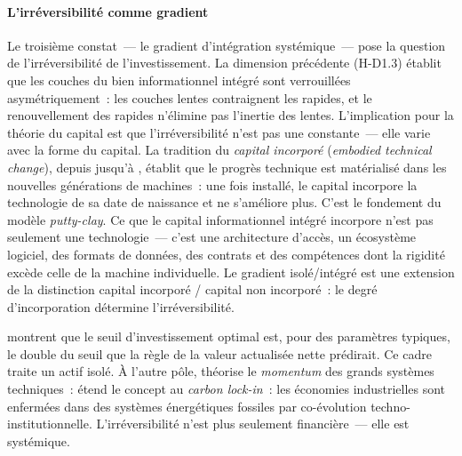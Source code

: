 \paragraph{L'irréversibilité comme gradient}

\markNEO \markSTS
Le troisième constat~--- le gradient d'intégration systémique~--- pose la question de l'irréversibilité de l'investissement. La dimension précédente (H-D1.3) établit que les couches du bien informationnel intégré sont verrouillées asymétriquement~: les couches lentes contraignent les rapides, et le renouvellement des rapides n'élimine pas l'inertie des lentes. L'implication pour la théorie du capital est que l'irréversibilité n'est pas une constante~--- elle varie avec la forme du capital. La tradition du \emph{capital incorporé} (\emph{embodied technical change}), depuis \textcite{solow_investment_1960} jusqu'à \textcite{johansen_substitution_1959}, établit que le progrès technique est matérialisé dans les nouvelles générations de machines~: une fois installé, le capital incorpore la technologie de sa date de naissance et ne s'améliore plus. C'est le fondement du modèle \emph{putty-clay}. Ce que le capital informationnel intégré incorpore n'est pas seulement une technologie~--- c'est une architecture d'accès, un écosystème logiciel, des formats de données, des contrats et des compétences dont la rigidité excède celle de la machine individuelle. Le gradient isolé/intégré est une extension de la distinction capital incorporé / capital non incorporé~: le degré d'incorporation détermine l'irréversibilité.

 \textcite{dixit_pindyck_1994} montrent que le seuil d'investissement optimal est, pour des paramètres typiques, le double du seuil que la règle de la valeur actualisée nette prédirait. Ce cadre traite un actif isolé. À l'autre pôle, \textcite{hughes_networks_1983} théorise le \emph{momentum} des grands systèmes techniques~:  \textcite{unruh_understanding_2000} étend le concept au \emph{carbon lock-in}~: les économies industrielles sont enfermées dans des systèmes énergétiques fossiles par co-évolution techno-institutionnelle. L'irréversibilité n'est plus seulement financière~--- elle est systémique.


